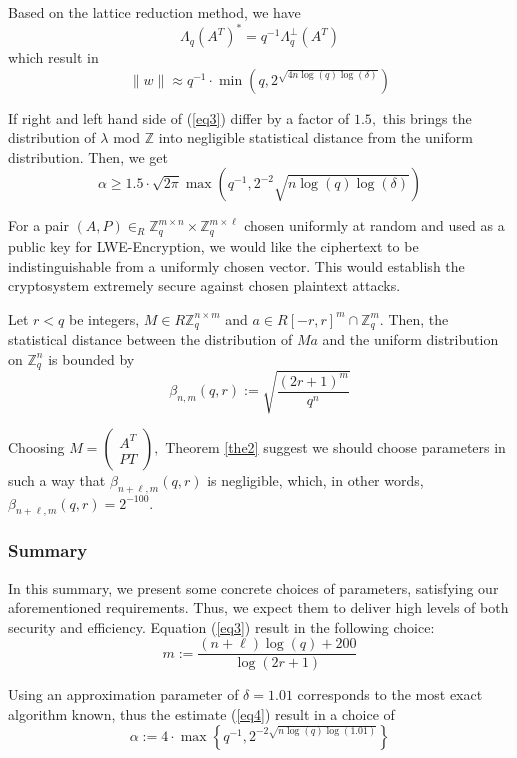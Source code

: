 Based on the lattice reduction method, we have 
$$\Lambda_{q}\left(A^{T}\right)^{*}=q^{-1} \Lambda_{q}^{\perp}\left(A^{T}\right)$$
which result in
$$\|w\| \approx q^{-1} \cdot \min \left(q, 2^{\sqrt{4 n \log (q) \log (\delta)}}\right)$$

If right and left hand side of (\ref{eq3}) differ by a factor of $1.5,$ this brings the distribution of $\lambda$ mod $\mathbb{Z}$ into negligible statistical distance from the uniform distribution. Then, we get 
\begin{equation}
    \alpha \geq 1.5 \cdot \sqrt{2 \pi} \max \left(q^{-1}, 2^{-2} \sqrt{n \log (q) \log (\delta)}\right)\label{eq4}
\end{equation}

For a pair $(A, P) \in_{R} \mathbb{Z}_{q}^{m \times n} \times \mathbb{Z}_{q}^{m \times \ell}$ chosen uniformly at random and used as a public key for LWE-Encryption, we would like the ciphertext to be indistinguishable from a uniformly chosen vector. This would establish the cryptosystem extremely secure against chosen plaintext attacks.

\begin{theorem}
    Let $r<q$ be integers, $M \in R \mathbb{Z}_{q}^{n \times m}$ and $a \in R[-r, r]^{m} \cap \mathbb{Z}_{q}^{m} .$ Then, the statistical distance between the distribution of $M a$ and the uniform distribution on $\mathbb{Z}_{q}^{n}$ is bounded by $$\beta_{n, m}(q, r) :=\sqrt{\frac{(2 r+1)^{m}}{q^{n}}}$$\label{the2}
\end{theorem}

Choosing $M=\left(\begin{array}{c}{A^{T}} \\ {P T}\end{array}\right),$ Theorem \ref{the2} suggest we should choose parameters in such a way that $\beta_{n+\ell, m}(q, r)$ is negligible, which, in other words, $\beta_{n+\ell, m}(q, r)=2^{-100}$.

\subsubsection{Summary}

In this summary, we present some concrete choices of parameters, satisfying our aforementioned requirements. Thus, we expect them to deliver high levels of both security and efficiency. Equation (\ref{eq3}) result in the following choice:
$$m :=\frac{(n+\ell) \log (q)+200}{\log (2 r+1)}$$

Using an approximation parameter of $\delta=1.01$ corresponds to the most exact algorithm known, thus the estimate (\ref{eq4}) result in a choice of
$$\alpha :=4 \cdot \max \left\{q^{-1}, 2^{-2 \sqrt{n \log (q) \log (1.01)}}\right\}$$

